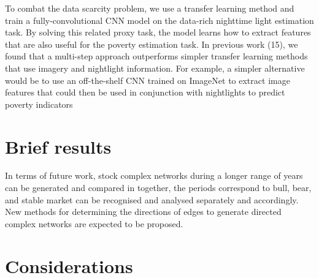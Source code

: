 To combat the data scarcity problem, we use a transfer learning method and train a fully-convolutional CNN model on the data-rich nighttime light estimation task. By solving this related proxy task, the model learns how to extract features that are also useful for the poverty estimation task. In previous work (15), we found that a multi-step approach outperforms simpler transfer learning methods that use imagery and nightlight information. For example, a simpler alternative would be to use an off-the-shelf CNN trained on ImageNet to extract image features that could then be used in conjunction with nightlights to predict poverty indicators



\section{Brief results}
In terms of future work, stock complex networks during a longer range of years can be generated and compared in together, the periods correspond to bull, bear, and stable market can be recognised and analysed separately and accordingly. New methods for determining the directions of edges to generate directed complex networks are expected to be proposed.

\section{Considerations}
